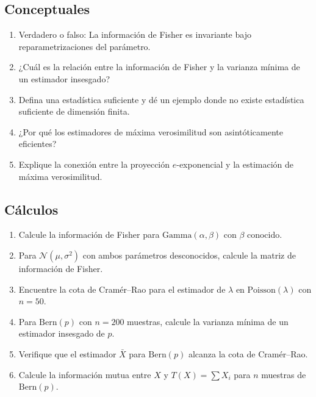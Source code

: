 \subsection*{Conceptuales}
\begin{enumerate}
	\item[$\star$] Verdadero o falso: La información de Fisher es invariante bajo reparametrizaciones del parámetro.
	\item[$\star$] ¿Cuál es la relación entre la información de Fisher y la varianza mínima de un estimador insesgado?
	\item[$\star$] Defina una estadística suficiente y dé un ejemplo donde no existe estadística suficiente de dimensión finita.
	\item[$\star$] ¿Por qué los estimadores de máxima verosimilitud son asintóticamente eficientes?
	\item[$\star$] Explique la conexión entre la proyección $e$-exponencial y la estimación de máxima verosimilitud.
\end{enumerate}

\subsection*{Cálculos}
\begin{enumerate}[resume]
	\item[$\star\star$] Calcule la información de Fisher para $\mathrm{Gamma}(\alpha, \beta)$ con $\beta$ conocido.
	\item[$\star\star$] Para $\mathcal{N}(\mu, \sigma^2)$ con ambos parámetros desconocidos, calcule la matriz de información de Fisher.
	\item[$\star\star$] Encuentre la cota de Cramér--Rao para el estimador de $\lambda$ en $\mathrm{Poisson}(\lambda)$ con $n = 50$.
	\item[$\star\star$] Para $\mathrm{Bern}(p)$ con $n = 200$ muestras, calcule la varianza mínima de un estimador insesgado de $p$.
	\item[$\star\star$] Verifique que el estimador $\bar{X}$ para $\mathrm{Bern}(p)$ alcanza la cota de Cramér--Rao.
	\item[$\star\star$] Calcule la información mutua entre $X$ y $T(X) = \sum X_i$ para $n$ muestras de $\mathrm{Bern}(p)$.
\end{enumerate}

